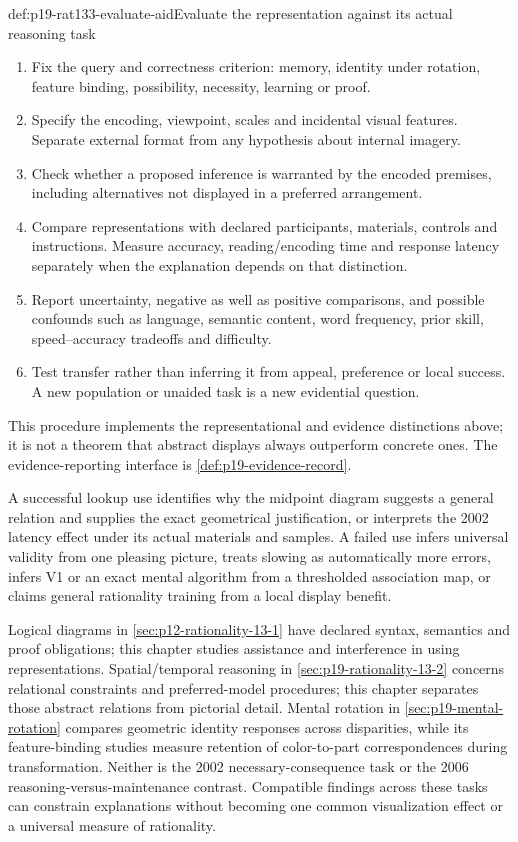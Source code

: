 \begin{hbmethod}{def:p19-rat133-evaluate-aid}{Evaluate the representation against its actual reasoning task}
\begin{enumerate}
\item Fix the query and correctness criterion: memory, identity under rotation,
      feature binding, possibility, necessity, learning or proof.
\item Specify the encoding, viewpoint, scales and incidental visual features.
      Separate external format from any hypothesis about internal imagery.
\item Check whether a proposed inference is warranted by the encoded premises,
      including alternatives not displayed in a preferred arrangement.
\item Compare representations with declared participants, materials, controls
      and instructions. Measure accuracy, reading/encoding time and response
      latency separately when the explanation depends on that distinction.
\item Report uncertainty, negative as well as positive comparisons, and
      possible confounds such as language, semantic content, word frequency,
      prior skill, speed--accuracy tradeoffs and difficulty.
\item Test transfer rather than inferring it from appeal, preference or local
      success. A new population or unaided task is a new evidential question.
\end{enumerate}
This procedure implements the representational and evidence distinctions
above; it is not a theorem that abstract displays always outperform concrete
ones. The evidence-reporting interface is \cref{def:p19-evidence-record}.
\end{hbmethod}

A successful lookup use identifies why the midpoint diagram suggests a
general relation and supplies the exact geometrical justification, or
interprets the 2002 latency effect under its actual materials and samples.
A failed use infers universal validity from one pleasing picture, treats
slowing as automatically more errors, infers V1 or an exact mental algorithm
from a thresholded association map, or claims general rationality training
from a local display benefit.

Logical diagrams in \cref{sec:p12-rationality-13-1} have declared syntax,
semantics and proof obligations; this chapter studies assistance and
interference in using representations. Spatial/temporal reasoning in
\cref{sec:p19-rationality-13-2} concerns relational constraints and
preferred-model procedures; this chapter separates those abstract relations
from pictorial detail. Mental rotation in \cref{sec:p19-mental-rotation}
compares geometric identity responses across disparities, while its
feature-binding studies measure retention of color-to-part correspondences
during transformation. Neither is the 2002 necessary-consequence task or
the 2006 reasoning-versus-maintenance contrast. Compatible findings across
these tasks can constrain explanations without becoming one common
visualization effect or a universal measure of rationality.
